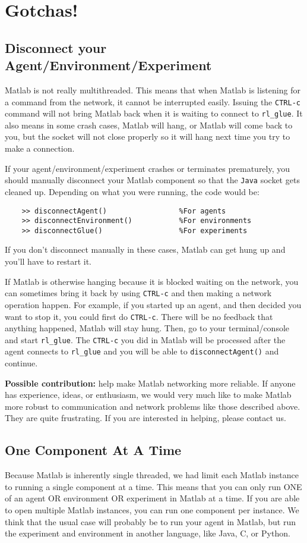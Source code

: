 \documentclass[11pt]{article}
\begin{document}
\section{Gotchas!}
\subsection{Disconnect your Agent/Environment/Experiment}
Matlab is not really multithreaded.  This means that when Matlab is listening for a command from the network, it cannot be interrupted easily. Issuing the  \texttt{CTRL-c} command will not bring Matlab back when it is waiting to connect to \texttt{rl\_glue}.  It also means in some crash cases, Matlab will hang, or Matlab will come back to you, but the socket will not close properly so it will hang next time you try to make a connection.

If your agent/environment/experiment crashes or terminates prematurely, you should manually disconnect your Matlab component so that the \texttt{Java} socket gets cleaned up.  Depending on what you were running, the code would be:
\begin{verbatim}
	>> disconnectAgent()                 %For agents
	>> disconnectEnvironment()           %For environments
	>> disconnectGlue()                  %For experiments
\end{verbatim}

If you don't disconnect manually in these cases, Matlab can get hung up and you'll have to restart it.

If Matlab is otherwise hanging because it is blocked waiting on the network, you can sometimes bring it back by using \texttt{CTRL-c} and then making a network operation happen.  For example, if you started up an agent, and then decided you want to stop it, you could first do  \texttt{CTRL-c}.  There will be no feedback that anything happened, Matlab will stay hung. Then, go to your terminal/console and start \texttt{rl\_glue}.  The \texttt{CTRL-c} you did in Matlab will be processed after the agent connects to \texttt{rl\_glue} and you will be able to \texttt{disconnectAgent()} and continue.

\textbf{Possible contribution:}  help make Matlab networking more reliable.  If anyone has experience, ideas, or enthusiasm, we would very much like to make Matlab more robust to communication and network problems like those described above.  They are quite frustrating.  If you are interested in helping, please contact us.


\subsection{One Component At A Time}
\label{one-at-a-time}
Because Matlab is inherently single threaded, we had limit each Matlab instance to running a single component at a time.  This means that you can only run ONE of an agent OR environment OR experiment in Matlab at a time.  If you are able to open multiple Matlab instances, you can run one
component per instance.  We think that the usual case will probably be to run your agent in Matlab, but run the experiment and environment in another language, like Java, C, or Python.
\end{document}
